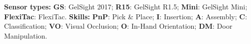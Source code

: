 \documentclass{article}
\begin{document}
\begin{table}[h]
\begin{threeparttable}
\begin{tablenotes}%
\small
\item 
\textbf{Sensor types:} 
\textbf{GS}: GelSight 2017; 
\textbf{R15}: GelSight R1.5; 
\textbf{Mini}: GelSight Mini; 
\textbf{FlexiTac}: FlexiTac.
\textbf{Skills:} 
\textbf{PnP}: Pick \& Place; 
\textbf{I}: Insertion; 
\textbf{A}: Assembly; 
\textbf{C}: Classification; 
\textbf{VO}: Visual Occlusion; 
\textbf{O}: In-Hand Orientation; 
\textbf{DM}: Door Manipulation.
\end{tablenotes}
\end{threeparttable}

\end{table}

    
\end{document}
